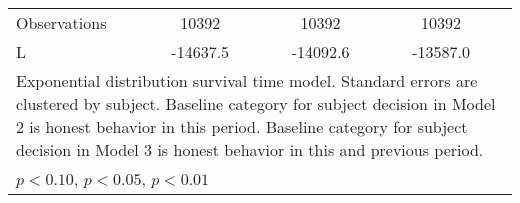 {\begin{tabular}{l*{3}{cc}}
\hline
Observations    &    10392         &         &    10392         &         &    10392         &         \\
L               & -14637.5         &         & -14092.6         &         & -13587.0         &         \\
\hline\hline
\multicolumn{7}{l}{\footnotesize Exponential distribution survival time model. Standard errors are clustered by subject. Baseline category for subject decision in Model 2 is honest behavior in this period. Baseline category for subject decision in Model 3 is honest behavior in this and previous period.}\\
\multicolumn{7}{l}{\footnotesize \sym{*} \(p<0.10\), \sym{**} \(p<0.05\), \sym{***} \(p<0.01\)}\\
\end{tabular}
}

